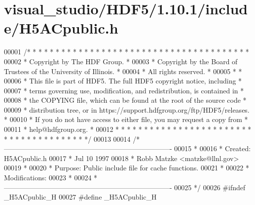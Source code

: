 \hypertarget{visual__studio_2_h_d_f5_21_810_81_2include_2_h5_a_cpublic_8h_source}{}\section{visual\+\_\+studio/\+H\+D\+F5/1.10.1/include/\+H5\+A\+Cpublic.h}
\label{visual__studio_2_h_d_f5_21_810_81_2include_2_h5_a_cpublic_8h_source}

\begin{DoxyCode}
00001 \textcolor{comment}{/* * * * * * * * * * * * * * * * * * * * * * * * * * * * * * * * * * * * * * *}
00002 \textcolor{comment}{ * Copyright by The HDF Group.                                               *}
00003 \textcolor{comment}{ * Copyright by the Board of Trustees of the University of Illinois.         *}
00004 \textcolor{comment}{ * All rights reserved.                                                      *}
00005 \textcolor{comment}{ *                                                                           *}
00006 \textcolor{comment}{ * This file is part of HDF5.  The full HDF5 copyright notice, including     *}
00007 \textcolor{comment}{ * terms governing use, modification, and redistribution, is contained in    *}
00008 \textcolor{comment}{ * the COPYING file, which can be found at the root of the source code       *}
00009 \textcolor{comment}{ * distribution tree, or in https://support.hdfgroup.org/ftp/HDF5/releases.  *}
00010 \textcolor{comment}{ * If you do not have access to either file, you may request a copy from     *}
00011 \textcolor{comment}{ * help@hdfgroup.org.                                                        *}
00012 \textcolor{comment}{ * * * * * * * * * * * * * * * * * * * * * * * * * * * * * * * * * * * * * * */}
00013 
00014 \textcolor{comment}{/*-------------------------------------------------------------------------}
00015 \textcolor{comment}{ *}
00016 \textcolor{comment}{ * Created:             H5ACpublic.h}
00017 \textcolor{comment}{ *                      Jul 10 1997}
00018 \textcolor{comment}{ *                      Robb Matzke <matzke@llnl.gov>}
00019 \textcolor{comment}{ *}
00020 \textcolor{comment}{ * Purpose:             Public include file for cache functions.}
00021 \textcolor{comment}{ *}
00022 \textcolor{comment}{ * Modifications:}
00023 \textcolor{comment}{ *}
00024 \textcolor{comment}{ *-------------------------------------------------------------------------}
00025 \textcolor{comment}{ */}
00026 \textcolor{preprocessor}{#ifndef \_H5ACpublic\_H}
00027 \textcolor{preprocessor}{#define \_H5ACpublic\_H}

\end{DoxyCode}
